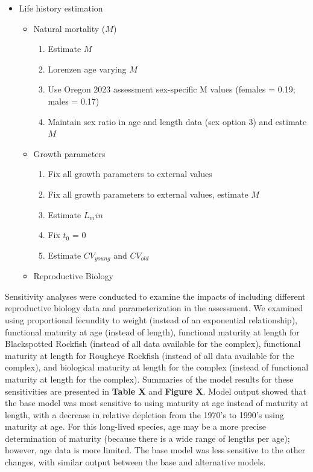 \documentclass[
]{scrartcl}
\providecommand{\tightlist}{%
  \setlength{\itemsep}{0pt}\setlength{\parskip}{0pt}}\usepackage{longtable,booktabs,array}
\begin{document}
\begin{itemize}
\tightlist
\item
  Life history estimation

  \begin{itemize}
  \tightlist
  \item
    Natural mortality (\(M\))

    \begin{enumerate}
    \def\labelenumi{\arabic{enumi}.}
    \tightlist
    \item
      Estimate \(M\)
    \item
      Lorenzen age varying \(M\)
    \item
      Use Oregon 2023 assessment sex-specific M values (females = 0.19;
      males = 0.17)
    \item
      Maintain sex ratio in age and length data (sex option 3) and
      estimate \(M\)
    \end{enumerate}
  \item
    Growth parameters

    \begin{enumerate}
    \def\labelenumi{\arabic{enumi}.}
    \setcounter{enumi}{5}
    \tightlist
    \item
      Fix all growth parameters to external values
    \item
      Fix all growth parameters to external values, estimate \(M\)
    \item
      Estimate \(L_min\)
    \item
      Fix \(t_0\) = 0
    \item
      Estimate \(CV_{young}\) and \(CV_{old}\)
    \end{enumerate}
  \item
    Reproductive Biology
  \end{itemize}
\end{itemize}

Sensitivity analyses were conducted to examine the impacts of including
different reproductive biology data and parameterization in the
assessment. We examined using proportional fecundity to weight (instead
of an exponential relationship), functional maturity at age (instead of
length), functional maturity at length for Blackspotted Rockfish
(instead of all data available for the complex), functional maturity at
length for Rougheye Rockfish (instead of all data available for the
complex), and biological maturity at length for the complex (instead of
functional maturity at length for the complex). Summaries of the model
results for these sensitivities are presented in \textbf{Table X} and
\textbf{Figure X}. Model output showed that the base model was most
sensitive to using maturity at age instead of maturity at length, with a
decrease in relative depletion from the 1970's to 1990's using maturity
at age. For this long-lived species, age may be a more precise
determination of maturity (because there is a wide range of lengths per
age); however, age data is more limited. The base model was less
sensitive to the other changes, with similar output between the base and
alternative models.
\end{document}

